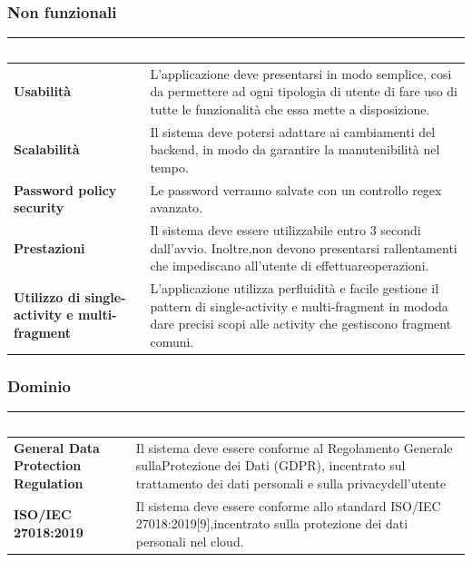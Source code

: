 \documentclass{article}
\begin{document}
			\subsubsection{Non funzionali}
			\begin{tabular}{|p{6cm}|p{8cm}|}
				\hline
				\cellcolor{dark_purple}\textcolor{white}{\textbf{Funzionalità}} & \cellcolor{dark_purple}\textcolor{white}{\textbf{Descrizione}} \\
				\hline
				\textbf{Usabilità} & L'applicazione deve presentarsi in modo semplice, cosi da permettere ad ogni tipologia di utente di fare uso di tutte le funzionalità che essa mette a disposizione. \\
				\hline
				\textbf{Scalabilità} & Il sistema deve potersi adattare ai cambiamenti del backend, in modo da garantire la manutenibilità nel tempo. \\
				\hline
				\textbf{Password policy security} & Le password verranno salvate con un controllo regex avanzato. \\
				\hline
				\textbf{Prestazioni} & Il sistema deve essere utilizzabile entro 3 secondi dall’avvio. Inoltre,non devono presentarsi rallentamenti che impediscano all’utente di effettuareoperazioni. \\
				\hline
				\textbf{Utilizzo di single-activity e multi-fragment} & L’applicazione utilizza perfluidità e facile gestione il pattern di single-activity e multi-fragment in mododa dare precisi scopi alle activity che gestiscono fragment comuni. \\
				\hline
			\end{tabular}
			\subsubsection{Dominio}
			\begin{tabular}{|p{6cm}|p{8cm}|}
				\hline
				\cellcolor{dark_purple}\textcolor{white}{\textbf{Dominio}} & \cellcolor{dark_purple}\textcolor{white}{\textbf{Descrizione}} \\
				\hline
				\textbf{General Data Protection Regulation} & Il sistema deve essere conforme al Regolamento Generale sullaProtezione dei Dati (GDPR), incentrato sul trattamento dei dati personali e sulla privacydell’utente \\
				\hline
				\textbf{ISO/IEC 27018:2019} & Il sistema deve essere conforme allo standard ISO/IEC 27018:2019[9],incentrato sulla protezione dei dati personali nel cloud. \\
				\hline
				\end{tabular}
				\newpage
\end{document}
